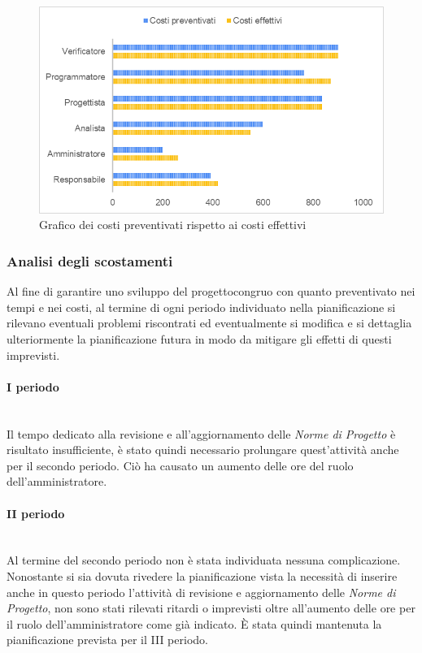 		\begin{figure} [H]
			\includegraphics[width=\linewidth]{./img/Grafici/16.png}
			\caption{Grafico dei costi preventivati rispetto ai costi effettivi}
		\end{figure}
		\subsubsection{Analisi degli scostamenti}
		Al fine di garantire uno sviluppo del progetto\glosp congruo con quanto preventivato nei tempi e nei costi, al termine di ogni periodo individuato nella pianificazione si rilevano eventuali problemi riscontrati ed eventualmente si modifica e si dettaglia ulteriormente la pianificazione futura in modo da mitigare gli effetti di questi imprevisti.
		\paragraph*{I periodo} \mbox{} \\
		Il tempo dedicato alla revisione e all'aggiornamento delle \textit{Norme di Progetto} è risultato insufficiente, è stato quindi necessario prolungare quest'attività anche per il secondo periodo.
		Ciò ha causato un aumento delle ore del ruolo dell'amministratore.
		\paragraph*{II periodo} \mbox{} \\
		Al termine del secondo periodo non è stata individuata nessuna complicazione. Nonostante si sia dovuta rivedere la pianificazione vista la necessità di inserire anche in questo periodo l'attività di revisione e aggiornamento delle \textit{Norme di Progetto}, non sono stati rilevati ritardi o imprevisti oltre all'aumento delle ore per il ruolo dell'amministratore come già indicato. È stata quindi mantenuta la pianificazione prevista per il III periodo.
